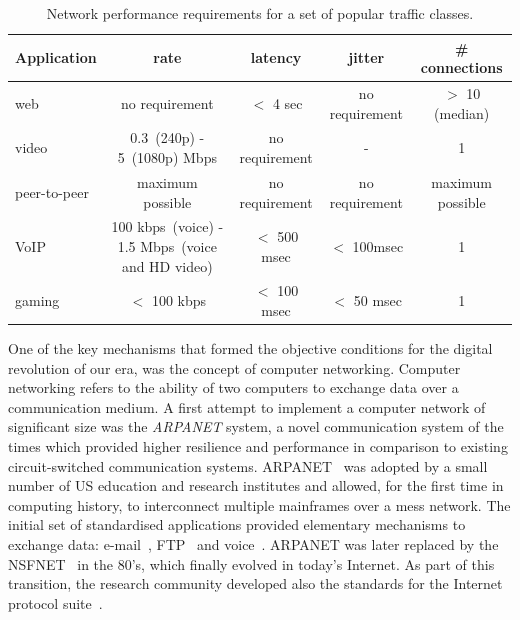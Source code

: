 \begin{table} 
  \centering
  {\tiny
    \begin{tabular}{ | p{3cm} | c c c c | } 
      \hline
      Application                              & rate                        & latency        & jitter         & \# connections \\ \hline 
      web~\cite{Akamai_4_seconds,Butkiewicz11} & no requirement              & $<$ 4 sec        & no requirement & $>$ 10 (median) \\ 
      video~\cite{Finamore11}                  & 0.3~(240p) - 5~(1080p) Mbps & no requirement & -              &  1 \\ 
      peer-to-peer~\cite{Rasti07,pouwelse2004} & maximum possible            & no requirement & no requirement &  maximum possible \\ 
      VoIP                                     & 100 kbps~(voice) - 1.5 Mbps~(voice and HD video)    & $<$ 500 msec       & $<$ 100msec      & 1 \\ 
      gaming~\cite{armitage2006networking}     &  $<$ 100 kbps                 & $<$ 100 msec       & $<$ 50 msec      & 1\\ \hline
    \end{tabular} 
  }
  \caption{Network performance requirements for a set of popular traffic classes.} 
  \label{tbl:application_requirement}
\end{table}


One of the key mechanisms that formed the objective conditions for the digital
revolution of our era, was the concept of computer networking.  Computer
networking refers to the ability of two computers to exchange data over a
communication medium. A first attempt to implement a computer network of
significant size was the {\it ARPANET} \/system, a novel communication system of
the times which provided higher resilience and performance in comparison to
existing circuit-switched communication systems.  ARPANET~\cite{beranek81} was
adopted by a small number of US education and research institutes and allowed,
for the first time in computing history, to interconnect multiple mainframes
over a mess network. The initial set of standardised applications provided
elementary mechanisms to exchange data: e-mail~\cite{RFC0561},
FTP~\cite{RFC0354} and voice~\cite{RFC0741}. ARPANET was later replaced by the
NSFNET~\cite{Mills:1987tt} in the 80's, which finally evolved in today's
Internet.  As part of this transition, the research community developed also the
standards for the Internet protocol suite~\cite{Clark:1988}.

